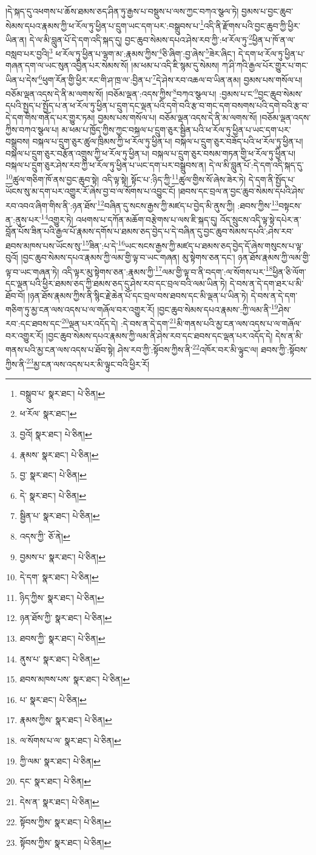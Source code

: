 །དེ་སྐད་དུ་འཕགས་པ་ཆོས་ཐམས་ཅད་ཤིན་ཏུ་རྒྱས་པ་བསྡུས་པ་ལས་ཀྱང་བཀའ་སྩལ་ཏེ། བྱམས་པ་བྱང་ཆུབ་སེམས་དཔའ་རྣམས་ཀྱི་ཕ་རོལ་ཏུ་ཕྱིན་པ་དྲུག་ཡང་དག་པར་:བསྒྲུབས་པ་\footnote{བསྒྲུབ་པ་  སྣར་ཐང་།  པེ་ཅིན། }འདི་ནི་རྫོགས་པའི་བྱང་ཆུབ་ཀྱི་ཕྱིར་ཡིན་ན། དེ་ལ་མི་བླུན་པོ་དེ་དག་འདི་སྐད་དུ། བྱང་ཆུབ་སེམས་དཔའ་ཤེས་རབ་ཀྱི་:ཕ་རོལ་ཏུ་\footnote{ཕ་རོལ་  སྣར་ཐང་། }ཕྱིན་པ་ཁོ་ན་ལ་བསླབ་པར་བྱའི།\footnote{བྱའོ།  སྣར་ཐང་།  པེ་ཅིན། } ཕ་རོལ་ཏུ་ཕྱིན་པ་ལྷག་མ་:རྣམས་ཀྱིས་\footnote{རྣམས་  སྣར་ཐང་།  པེ་ཅིན། }ཅི་ཞིག་:བྱ་ཞེས་\footnote{བྱ་  སྣར་ཐང་།  པེ་ཅིན། }ཟེར་ཞིང་། དེ་དག་ཕ་རོལ་ཏུ་ཕྱིན་པ་གཞན་དག་ལ་ཡང་སུན་འབྱིན་པར་སེམས་སོ། །མ་ཕམ་པ་འདི་ཇི་སྙམ་དུ་སེམས། ཀ་ཤི་ཀའི་རྒྱལ་པོར་གྱུར་པ་གང་ཡིན་པ་དེས་\footnote{དེ་  སྣར་ཐང་།  པེ་ཅིན། }ཕུག་རོན་གྱི་ཕྱིར་རང་གི་ཤ་ཁྲ་ལ་:བྱིན་པ་\footnote{སྦྱིན་པ་  སྣར་ཐང་།  པེ་ཅིན། }དེ་ཤེས་རབ་འཆལ་བ་ཡིན་ནམ། བྱམས་པས་གསོལ་པ། བཅོམ་ལྡན་འདས་དེ་ནི་མ་ལགས་སོ། །བཅོམ་ལྡན་:འདས་ཀྱིས་\footnote{འདས་ཀྱི་  ཅོ་ནེ། }བཀའ་སྩལ་པ། :བྱམས་པ་ང་\footnote{བྱམས་པ་  སྣར་ཐང་།  པེ་ཅིན། }བྱང་ཆུབ་སེམས་དཔའི་སྤྱད་པ་སྤྱོད་པ་ན་ཕ་རོལ་ཏུ་ཕྱིན་པ་དྲུག་དང་ལྡན་པའི་དགེ་བའི་རྩ་བ་གང་དག་བསགས་པའི་དགེ་བའི་རྩ་བ་དེ་དག་གིས་གནོད་པར་གྱུར་ཏམ། བྱམས་པས་གསོལ་པ། བཅོམ་ལྡན་འདས་དེ་ནི་མ་ལགས་སོ། །བཅོམ་ལྡན་འདས་ཀྱིས་བཀའ་སྩལ་པ། མ་ཕམ་པ་ཁྱོད་ཀྱིས་ཀྱང་བསྐལ་པ་དྲུག་ཅུར་སྦྱིན་པའི་ཕ་རོལ་ཏུ་ཕྱིན་པ་ཡང་དག་པར་བསྒྲུབས། བསྐལ་པ་དྲུག་ཅུར་ཚུལ་ཁྲིམས་ཀྱི་ཕ་རོལ་ཏུ་ཕྱིན་པ། བསྐལ་པ་དྲུག་ཅུར་བཟོད་པའི་ཕ་རོལ་ཏུ་ཕྱིན་པ། བསྐལ་པ་དྲུག་ཅུར་བརྩོན་འགྲུས་ཀྱི་ཕ་རོལ་ཏུ་ཕྱིན་པ། བསྐལ་པ་དྲུག་ཅུར་བསམ་གཏན་གྱི་ཕ་རོལ་ཏུ་ཕྱིན་པ། བསྐལ་པ་དྲུག་ཅུར་ཤེས་རབ་ཀྱི་ཕ་རོལ་ཏུ་ཕྱིན་པ་ཡང་དག་པར་བསྒྲུབས་ན། དེ་ལ་མི་བླུན་པོ་:དེ་དག་འདི་སྐད་དུ་\footnote{དེ་དག་  སྣར་ཐང་།  པེ་ཅིན། }ཚུལ་གཅིག་ཁོ་ནས་བྱང་ཆུབ་སྟེ། འདི་ལྟ་སྟེ། སྟོང་པ་:ཉིད་ཀྱི་\footnote{ཉིད་ཀྱིས་  སྣར་ཐང་།  པེ་ཅིན། }ཚུལ་གྱིས་སོ་ཞེས་ཟེར་ཏེ། དེ་དག་ནི་སྤྱོད་པ་ཡོངས་སུ་མ་དག་པར་འགྱུར་རོ་ཞེས་བྱ་བ་ལ་སོགས་པ་འབྱུང་ངོ། །ཐབས་དང་བྲལ་ན་བྱང་ཆུབ་སེམས་དཔའི་ཤེས་རབ་འབའ་ཞིག་གིས་ནི་:ཉན་ཐོས་\footnote{ཉན་ཐོས་ཀྱི་  སྣར་ཐང་།  པེ་ཅིན། }བཞིན་དུ་སངས་རྒྱས་ཀྱི་མཛད་པ་བྱེད་མི་ནུས་ཀྱི། :ཐབས་ཀྱིས་\footnote{ཐབས་ཀྱི་  སྣར་ཐང་།  པེ་ཅིན། }བསྟངས་ན་:ནུས་པར་\footnote{ནུས་པ་  སྣར་ཐང་།  པེ་ཅིན། }འགྱུར་ཏེ། འཕགས་པ་དཀོན་མཆོག་བརྩེགས་པ་ལས་ཇི་སྐད་དུ། འོད་སྲུངས་འདི་ལྟ་སྟེ་དཔེར་ན་བློན་པོས་ཟིན་པའི་རྒྱལ་པོ་རྣམས་དགོས་པ་ཐམས་ཅད་བྱེད་པ་དེ་བཞིན་དུ་བྱང་ཆུབ་སེམས་དཔའི་:ཤེས་རབ་ཐབས་མཁས་པས་ཡོངས་སུ་\footnote{ཐབས་མཁས་པས་  སྣར་ཐང་།  པེ་ཅིན། }ཟིན་:པ་དེ་\footnote{པ་  སྣར་ཐང་།  པེ་ཅིན། }ཡང་སངས་རྒྱས་ཀྱི་མཛད་པ་ཐམས་ཅད་བྱེད་དོ་ཞེས་གསུངས་པ་ལྟ་བུའོ། །བྱང་ཆུབ་སེམས་དཔའ་རྣམས་ཀྱི་ལམ་གྱི་ལྟ་བ་ཡང་གཞན། མུ་སྟེགས་ཅན་དང་། ཉན་ཐོས་རྣམས་ཀྱི་ལམ་གྱི་ལྟ་བ་ཡང་གཞན་ཏེ། འདི་ལྟར་མུ་སྟེགས་ཅན་:རྣམས་ཀྱི་\footnote{རྣམས་ཀྱིས་  སྣར་ཐང་།  པེ་ཅིན། }ལམ་གྱི་ལྟ་བ་ནི་བདག་:ལ་སོགས་པར་\footnote{ལ་སོགས་པ་ལ་  སྣར་ཐང་།  པེ་ཅིན། }ཕྱིན་ཅི་ལོག་དང་ལྡན་པའི་ཕྱིར་ཐམས་ཅད་ཀྱི་ཐམས་ཅད་དུ་ཤེས་རབ་དང་བྲལ་བའི་ལམ་ཡིན་ཏེ། དེ་བས་ན་དེ་དག་ཐར་པ་མི་ཐོབ་བོ། །ཉན་ཐོས་རྣམས་ཀྱིས་ནི་སྙིང་རྗེ་ཆེན་པོ་དང་བྲལ་བས་ཐབས་དང་མི་ལྡན་པ་ཡིན་ཏེ། དེ་བས་ན་དེ་དག་གཅིག་ཏུ་མྱ་ངན་ལས་འདས་པ་ལ་གཞོལ་བར་འགྱུར་རོ། །བྱང་ཆུབ་སེམས་དཔའ་རྣམས་:ཀྱི་ལམ་ནི་\footnote{ཀྱི་ལམ་  སྣར་ཐང་།  པེ་ཅིན། }ཤེས་རབ་:དང་ཐབས་དང་\footnote{དང་  སྣར་ཐང་།  པེ་ཅིན། }ལྡན་པར་འདོད་དེ། :དེ་བས་ན་དེ་དག་\footnote{དེས་ན་  སྣར་ཐང་།  པེ་ཅིན། }མི་གནས་པའི་མྱ་ངན་ལས་འདས་པ་ལ་གཞོལ་བར་འགྱུར་རོ། །བྱང་ཆུབ་སེམས་དཔའ་རྣམས་ཀྱི་ལམ་ནི་ཤེས་རབ་དང་ཐབས་དང་ལྡན་པར་འདོད་དེ། དེས་ན་མི་གནས་པའི་མྱ་ངན་ལས་འདས་པ་ཐོབ་སྟེ། ཤེས་རབ་ཀྱི་:སྟོབས་ཀྱིས་ནི་\footnote{སྟོབས་ཀྱིས་  སྣར་ཐང་།  པེ་ཅིན། }འཁོར་བར་མི་ལྟུང་ལ། ཐབས་ཀྱི་:སྟོབས་ཀྱིས་ནི་\footnote{སྟོབས་ཀྱིས་  སྣར་ཐང་།  པེ་ཅིན། }མྱ་ངན་ལས་འདས་པར་མི་ལྟུང་བའི་ཕྱིར་རོ། 